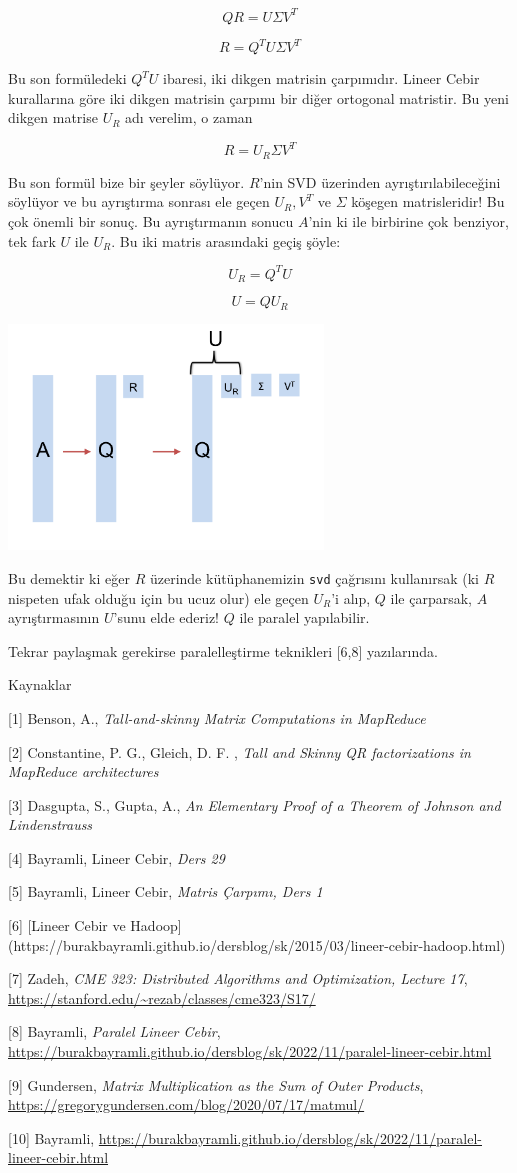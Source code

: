 \documentclass[12pt,fleqn]{article}\usepackage{../../common}
\begin{document}
$$ QR =  U \Sigma V^T $$

$$ R = Q^T U \Sigma V^T $$

Bu son formüledeki $Q^TU$ ibaresi, iki dikgen matrisin çarpımıdır. Lineer Cebir
kurallarına göre iki dikgen matrisin çarpımı bir diğer ortogonal matristir. Bu
yeni dikgen matrise $U_R$ adı verelim, o zaman

$$ R = U_R \Sigma V^T $$

Bu son formül bize bir şeyler söylüyor. $R$'nin SVD üzerinden
ayrıştırılabileceğini söylüyor ve bu ayrıştırma sonrası ele geçen $U_R,V^T$ ve
$\Sigma$ köşegen matrisleridir! Bu çok önemli bir sonuç.  Bu ayrıştırmanın
sonucu $A$'nin ki ile birbirine çok benziyor, tek fark $U$ ile $U_R$. Bu iki
matris arasındaki geçiş şöyle:

$$ U_R = Q^T U $$ 

$$ U = QU_R $$ 

\includegraphics[height=6cm]{ur.png}

Bu demektir ki eğer $R$ üzerinde kütüphanemizin \verb!svd!  çağrısını
kullanırsak (ki $R$ nispeten ufak olduğu için bu ucuz olur) ele geçen $U_R$'i
alıp, $Q$ ile çarparsak, $A$ ayrıştırmasının $U$'sunu elde ederiz! $Q$ ile
paralel yapılabilir.

Tekrar paylaşmak gerekirse paralelleştirme teknikleri [6,8] yazılarında.

Kaynaklar

[1] Benson, A., {\em Tall-and-skinny Matrix Computations in MapReduce}

[2] Constantine, P. G., Gleich, D. F. , {\em Tall and Skinny QR factorizations in MapReduce architectures}

[3] Dasgupta, S., Gupta, A., {\em An Elementary Proof of a Theorem of Johnson and Lindenstrauss}

[4] Bayramli, Lineer Cebir, {\em Ders 29}

[5] Bayramli, Lineer Cebir, {\em Matris Çarpımı, Ders 1}

[6] [Lineer Cebir ve Hadoop](https://burakbayramli.github.io/dersblog/sk/2015/03/lineer-cebir-hadoop.html)

[7] Zadeh, {\em CME 323: Distributed Algorithms and Optimization, Lecture 17},
    \url{https://stanford.edu/~rezab/classes/cme323/S17/}

[8] Bayramli, {\em Paralel Lineer Cebir},
    \url{https://burakbayramli.github.io/dersblog/sk/2022/11/paralel-lineer-cebir.html}

[9] Gundersen, {\em Matrix Multiplication as the Sum of Outer Products},
    \url{https://gregorygundersen.com/blog/2020/07/17/matmul/}

[10] Bayramli, \url{https://burakbayramli.github.io/dersblog/sk/2022/11/paralel-lineer-cebir.html}
\end{document}
